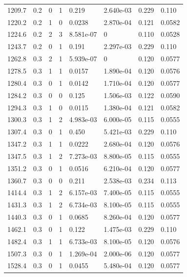 \documentclass[preview]{standalone}
\begin{document}
{{{\begin{tabular}{L{1.2cm}C{1.2cm} C{0.3cm}C{0.5cm} C{1.4cm}C{1.4cm} C{1.4cm}C{1.4cm}}
  1209.7  &   0.2  & 0     &  1 &  0.219  & 2.640e-03  & 0.229 &  0.110   \\ 
  1220.2  &   0.2  & 1     &  0 &  0.0238  & 2.870e-04  & 0.121 &  0.0582   \\ 
  1224.6  &   0.2  & 2     &  3 &  8.581e-07  & 0  & 0.110 &  0.0528   \\ 
  1243.7  &   0.2  & 0     &  1 &  0.191  & 2.297e-03  & 0.229 &  0.110   \\ 
  1262.8  &   0.3  & 2     &  1 &  5.939e-07  & 0  & 0.120 &  0.0577   \\ 
  1278.5  &   0.3  & 1     &  1 &  0.0157  & 1.890e-04  & 0.120 &  0.0576   \\ 
  1280.4  &   0.3  & 0     &  1 &  0.0142  & 1.710e-04  & 0.120 &  0.0577   \\ 
  1284.2  &   0.3  & 0     &  0 &  0.125  & 1.506e-03  & 0.122 &  0.0590   \\ 
  1294.3  &   0.3  & 1     &  0 &  0.0115  & 1.380e-04  & 0.121 &  0.0582   \\ 
  1300.3  &   0.3  & 1     &  2 &  4.983e-03  & 6.000e-05  & 0.115 &  0.0555   \\ 
  1307.4  &   0.3  & 0     &  1 &  0.450  & 5.421e-03  & 0.229 &  0.110   \\ 
  1347.2  &   0.3  & 1     &  1 &  0.0222  & 2.680e-04  & 0.120 &  0.0576   \\ 
  1347.5  &   0.3  & 1     &  2 &  7.273e-03  & 8.800e-05  & 0.115 &  0.0555   \\ 
  1351.2  &   0.3  & 0     &  1 &  0.0516  & 6.210e-04  & 0.120 &  0.0577   \\ 
  1360.7  &   0.3  & 0     &  0 &  0.211  & 2.538e-03  & 0.234 &  0.113   \\ 
  1414.4  &   0.3  & 1     &  2 &  6.157e-03  & 7.400e-05  & 0.115 &  0.0555   \\ 
  1431.3  &   0.3  & 1     &  2 &  6.734e-03  & 8.100e-05  & 0.115 &  0.0555   \\ 
  1440.3  &   0.3  & 0     &  1 &  0.0685  & 8.260e-04  & 0.120 &  0.0577   \\ 
  1462.1  &   0.3  & 0     &  1 &  0.122  & 1.475e-03  & 0.229 &  0.110   \\ 
  1482.4  &   0.3  & 1     &  1 &  6.733e-03  & 8.100e-05  & 0.120 &  0.0576   \\ 
  1507.3  &   0.3  & 0     &  1 &  1.269e-04  & 2.000e-06  & 0.120 &  0.0577   \\ 
  1528.4  &   0.3  & 0     &  1 &  0.0455  & 5.480e-04  & 0.120 &  0.0577   \\ 

\end{tabular}}}}
\end{document}
